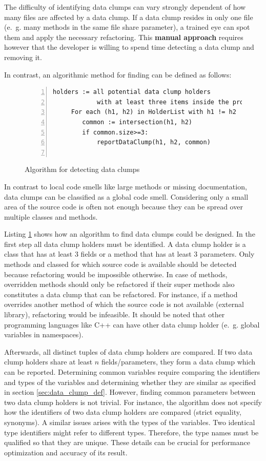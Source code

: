 The difficulty of identifying data clumps can vary strongly dependent of how many files are affected by a data clump. If a data clump resides in only one file (e.~g. many methods in the same file share parameter), a trained eye can spot them and apply the necessary refactoring. This \textbf{manual approach} requires however that the developer is willing to spend time detecting a data clump and removing it. 

In contrast, an algorithmic method for finding can be defined as follows:
\begin{figure}
\begin{lstlisting}[numbers=left]
    holders := all potential data clump holders 
            with at least three items inside the project
     For each (h1, h2) in HolderList with h1 != h2
        common := intersection(h1, h2)
        if common.size>=3:
            reportDataClump(h1, h2, common)
        

\end{lstlisting}
\caption{Algorithm for detecting data clumps}
\label{lst:data_clumps_algo}
\end{figure}
In contrast to local code smells like large methods or missing documentation, data clumps can be classified as a global code smell. Considering only a small area of the source code is often not enough because they can be spread over multiple classes and methods. 





Listing \ref{lst:data_clumps_algo} shows how an algorithm to find data clumps could be designed. In the first step all data clump holders must be identified.
A data clump holder is a class that has at least 3 fields or a method that has at least 3 parameters.  Only methods and classed for which source code is available should be detected because refactoring would be impossible otherwise. In case of methods, overridden methods should only be refactored if their super methods also constitutes a data clump that can be refactored.  For instance, if a method overrides another method of which the source code is not available (external library), refactoring would be infeasible. 
It should be noted that other programming languages like C++ can have other data clump holder (e.~g. global variables in namespaces). 


Afterwards, all distinct tuples of data clump holders are compared. If two data clump holders share at least $n$ fields/parameters, they form a data clump which can be reported. Determining common variables require comparing the identifiers and types of the variables and determining whether they are similar as specified in section \ref{sec:data_clump_def}. However, finding common parameters between two data clump holders is not trivial.  For instance, the algorithm does not specify how the identifiers of two data clump holders are compared (strict equality, synonyms). A similar issues arises with the types of the variables.  Two identical type identifiers might refer to different types. Therefore, the type names must be qualified so that they are unique. These details can be crucial for performance optimization and accuracy of its result. 



